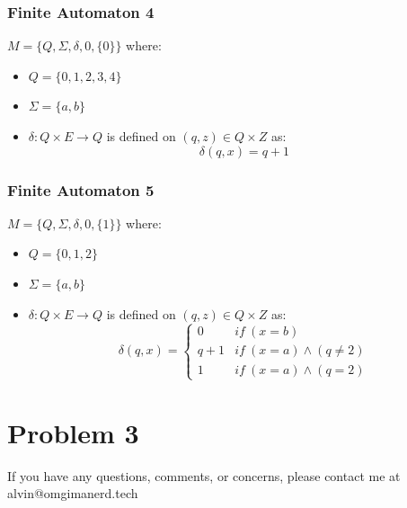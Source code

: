 \documentclass[letterpaper, 12pt]{math}
\begin{document}
\subsubsection*{Finite Automaton 4}
\( M = \{Q,\Sigma,\delta,0,\{0\}\} \) where:
\begin{itemize}
  \item \( Q = \{0,1,2,3,4\} \)
  \item \( \Sigma = \{a,b\} \)
  \item \( \delta: Q\times E\to Q \) is defined on \( (q,z)\in Q\times Z \) as:
    \[ \delta(q,x) = q+1 \]
\end{itemize}

\subsubsection*{Finite Automaton 5}
\( M = \{Q,\Sigma,\delta,0,\{1\}\} \) where:
\begin{itemize}
  \item \( Q = \{0,1,2\} \)
  \item \( \Sigma = \{a,b\} \)
  \item \( \delta: Q\times E\to Q \) is defined on \( (q,z)\in Q\times Z \) as:
    \[ \delta(q,x) = \begin{cases}
      0 & if\ (x = b) \\
      q+1 & if\ (x = a) \wedge (q \ne 2) \\
      1 & if\ (x = a) \wedge (q = 2)
    \end{cases} \]
\end{itemize}

\section*{Problem 3}

\begin{center}
  If you have any questions, comments, or concerns, please contact me at
  alvin@omgimanerd.tech
\end{center}
\end{document}
